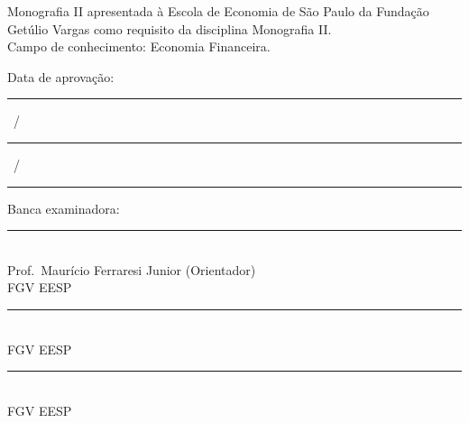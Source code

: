 \documentclass[12pt,a4paper]{article}
\begin{document}
\vspace{1.5cm}

\begin{flushright}
\begin{minipage}{0.62\textwidth}
\small{}
Monografia II apresentada à Escola de Economia de São Paulo da Fundação Getúlio
Vargas como requisito da disciplina Monografia II.
\\[10pt]
Campo de conhecimento: Economia Financeira.
\end{minipage}
\end{flushright}

\vspace{1.5cm}

\noindent Data de aprovação:

\vspace{0.4cm}

\noindent \rule{2cm}{0.4pt}\ /\ \rule{2cm}{0.4pt}\ /\ \rule{2.4cm}{0.4pt}

\vspace{1.5cm}

\noindent Banca examinadora:

\vspace{1.8cm}

\noindent \rule{0.62\textwidth}{0.4pt}\\
Prof.\ Maurício Ferraresi Junior (Orientador)\\
FGV EESP

\vspace{1.6cm}

\noindent \rule{0.62\textwidth}{0.4pt}\\
FGV EESP

\vspace{1.6cm}

\noindent \rule{0.62\textwidth}{0.4pt}\\
FGV EESP

\vfill

\newpage
\end{document}
